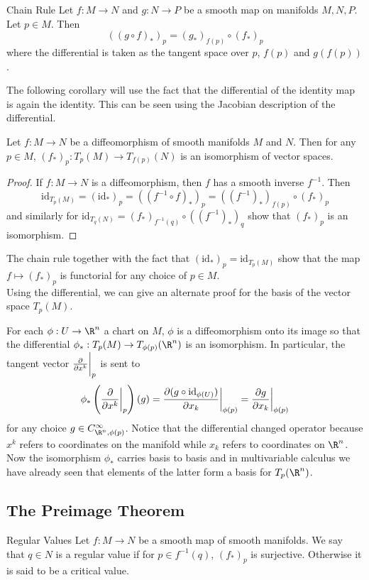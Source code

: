 \documentclass[a4paper]{article}
\begin{document}
\begin{prp}{Chain Rule}{} Let $f:M\to N$ and $g:N\to P$ be a smooth map on manifolds $M,N,P$. Let $p\in M$. Then $$((g\circ f)_\ast)_p=(g_\ast)_{f(p)}\circ (f_\ast)_p$$ where the differential is taken as the tangent space over $p$, $f(p)$ and $g(f(p))$. 
\end{prp}

The following corollary will use the fact that the differential of the identity map is again the identity. This can be seen using the Jacobian description of the differential. 

\begin{crl}{}{} Let $f:M\to N$ be a diffeomorphism of smooth manifolds $M$ and $N$. Then for any $p\in M$, $(f_\ast)_p:T_p(M)\to T_{f(p)}(N)$ is an isomorphism of vector spaces. 
\begin{proof}
If $f:M\to N$ is a diffeomorphism, then $f$ has a smooth inverse $f^{-1}$. Then $$\text{id}_{T_p(M)}=(\text{id}_\ast)_p=((f^{-1}\circ f)_\ast)_p=((f^{-1})_\ast)_{f(p)}\circ(f_\ast)_p$$ and similarly for $\text{id}_{T_q(N)}=(f_\ast)_{f^{-1}(q)}\circ((f^{-1})_\ast)_q$ show that $(f_\ast)_p$ is an isomorphism. 
\end{proof}
\end{crl}

The chain rule together with the fact that $(\text{id}_\ast)_p=\text{id}_{T_p(M)}$ show that the map $f\mapsto(f_\ast)_p$ is functorial for any choice of $p\in M$. \\

Using the differential, we can give an alternate proof for the basis of the vector space $T_p(M)$. 

For each $\phi:U\to\R^n$ a chart on $M$, $\phi$ is a diffeomorphism onto its image so that the differential $\phi_\ast:T_p(M)\to T_{\phi(p)}(\R^n)$ is an isomorphism. In particular, the tangent vector $\frac{\partial}{\partial x^k}\bigg{|}_p$ is sent to $$\phi_\ast\left(\frac{\partial}{\partial x^k}\bigg{|}_p\right)(g)=\frac{\partial(g\circ\text{id}_{\phi(U)})}{\partial x_k}\bigg{|}_{\phi(p)}=\frac{\partial g}{\partial x_k}\bigg{|}_{\phi(p)}$$ for any choice $g\in C_{\R^n,\phi(p)}^\infty$. Notice that the differential changed operator because $x^k$ refers to coordinates on the manifold while $x_k$ refers to coordinates on $\R^n$. Now the isomorphism $\phi_\ast$ carries basis to basis and in multivariable calculus we have already seen that elements of the latter form a basis for $T_p(\R^n)$. 

\subsection{The Preimage Theorem}
\begin{defn}{Regular Values}{} Let $f:M\to N$ be a smooth map of smooth manifolds. We say that $q\in N$ is a regular value if for $p\in f^{-1}(q)$, $(f_\ast)_p$ is surjective. Otherwise it is said to be a critical value. 
\end{defn}
\end{document}
